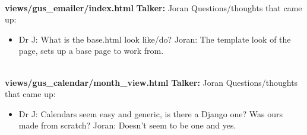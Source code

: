 \documentclass[12pt]{report}
\begin{document}
 \textbf{\\[0.5pt] views/gus\_emailer/index.html}\newline
 \textbf{Talker:} Joran\newline
 Questions/thoughts that came up:
 \begin{itemize}
  \item Dr J: What is the base.html look like/do?\newline
           Joran: The template look of the page, sets up a base page to work from.
 \end{itemize}

 \textbf{\\[0.5pt] views/gus\_calendar/month\_view.html}\newline
 \textbf{Talker:} Joran\newline
 Questions/thoughts that came up:
 \begin{itemize}
  \item Dr J: Calendars seem easy and generic, is there a Django one? Was ours made from scratch?\newline
          Joran: Doesn't seem to be one and yes.
 \end{itemize}
\end{document}
